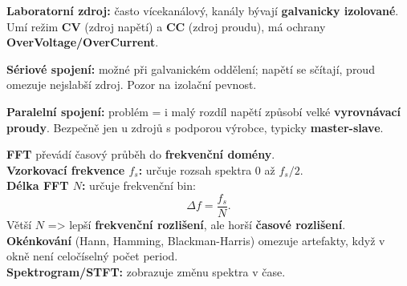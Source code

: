 \documentclass[12pt]{article}
\newcounter{chapternumber}
\newcounter{questionnumber}
\renewcommand{\thequestionnumber}{\arabic{chapternumber}.\arabic{questionnumber}}
\begin{document}
\begin{tcolorbox}[title={\stepcounter{questionnumber}\thequestionnumber. Popište základní vlastnosti laboratorního napájecího zdroje. Kdy lze zdroje spojovat sériově a proč je paralelní spojování problematické? (26–32)}]
\textbf{Laboratorní zdroj:} často vícekanálový, kanály bývají \textbf{galvanicky izolované}. Umí režim \textbf{CV} (zdroj napětí) a \textbf{CC} (zdroj proudu), má ochrany \textbf{OverVoltage/OverCurrent}.

\textbf{Sériové spojení:} možné při galvanickém oddělení; napětí se sčítají, proud omezuje nejslabší zdroj. Pozor na izolační pevnost.

\textbf{Paralelní spojení:} problém = i malý rozdíl napětí způsobí velké \textbf{vyrovnávací proudy}. Bezpečně jen u zdrojů s podporou výrobce, typicky \textbf{master-slave}.
\end{tcolorbox}

\begin{tcolorbox}[title={\stepcounter{questionnumber}\thequestionnumber. Popište základní princip spektrální analýzy pomocí FFT. Jak souvisí vzorkovací frekvence, délka FFT a frekvenční rozlišení? (33–40)}]
\textbf{FFT} převádí časový průběh do \textbf{frekvenční domény}.\\
\textbf{Vzorkovací frekvence $f_s$:} určuje rozsah spektra $0$ až $f_s/2$.\\
\textbf{Délka FFT $N$:} určuje frekvenční bin:
\[
\Delta f = \frac{f_s}{N}.
\]
Větší $N$ => lepší \textbf{frekvenční rozlišení}, ale horší \textbf{časové rozlišení}.\\
\textbf{Okénkování} (Hann, Hamming, Blackman-Harris) omezuje artefakty, když v okně není celočíselný počet period.\\
\textbf{Spektrogram/STFT:} zobrazuje změnu spektra v čase.
\end{tcolorbox}


\newpage


\newpage
\end{document}
